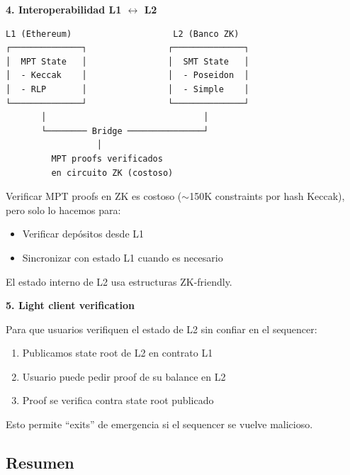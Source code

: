 \documentclass[11pt,a4paper,twoside,openright]{book}
\theoremstyle{definition}
\theoremstyle{plain}
\theoremstyle{remark}
\begin{document}
\begin{bancozk}
\textbf{4. Interoperabilidad L1 $\leftrightarrow$ L2}

\begin{verbatim}
L1 (Ethereum)                    L2 (Banco ZK)
┌──────────────┐                ┌──────────────┐
│  MPT State   │                │  SMT State   │
│  - Keccak    │                │  - Poseidon  │
│  - RLP       │                │  - Simple    │
└──────────────┘                └──────────────┘
       │                               │
       └──────── Bridge ───────────────┘
                  │
         MPT proofs verificados
         en circuito ZK (costoso)
\end{verbatim}

Verificar MPT proofs en ZK es costoso ($\sim$150K constraints por hash Keccak), pero solo lo hacemos para:
\begin{itemize}
    \item Verificar depósitos desde L1
    \item Sincronizar con estado L1 cuando es necesario
\end{itemize}

El estado interno de L2 usa estructuras ZK-friendly.

\textbf{5. Light client verification}

Para que usuarios verifiquen el estado de L2 sin confiar en el sequencer:
\begin{enumerate}
    \item Publicamos state root de L2 en contrato L1
    \item Usuario puede pedir proof de su balance en L2
    \item Proof se verifica contra state root publicado
\end{enumerate}

Esto permite ``exits'' de emergencia si el sequencer se vuelve malicioso.
\end{bancozk}

\subsection{Resumen}
\end{document}
